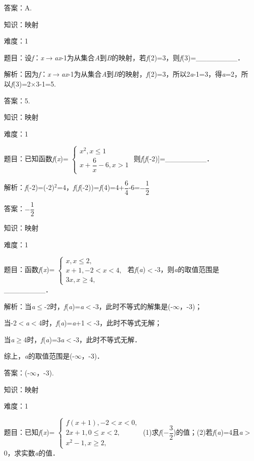 \documentclass{article} %
\begin{document}
答案：A.

知识：映射

难度：1

题目：设\textit{f}：\textit{x}$\mathrm{\to}$\textit{ax}-1为从集合\textit{A}到\textit{B}的映射，若\textit{f}(2)=3，则\textit{f}(3)=\_\_\_\_\_\_\_\_．

解析：因为\textit{f}：\textit{x}$\mathrm{\to}$\textit{ax}-1为从集合\textit{A}到\textit{B}的映射，\textit{f}(2)=3，所以2\textit{a}-1=3，得\textit{a}=2，所以\textit{f}(3)=2$\mathrm{\times}$3-1=5.

答案：5.

知识：映射

难度：1

题目：已知函数\textit{f}(\textit{x})=
$\left\{
\begin{array}{l}
	x^{2},x\le 1\\
	x+\dfrac{6}{x}-6, x> 1
\end{array}
\right.$
则\textit{f}[\textit{f}(-2)]=\_\_\_\_\_\_\_\_．

解析：\textit{f}(-2)=(-2)${}^{2}$=4，\textit{f}(\textit{f}(-2))=\textit{f}(4)=4+$\dfrac{6}{4}$-6=$-\dfrac{1}{2}$

答案：$-\dfrac{1}{2}$

知识：映射

难度：1

题目：函数\textit{f}(\textit{x})=
$\left\{
\begin{array}{l}
	x,x\le 2,\\
	x+1, -2<x<4,\\
	3x, x\ge 4,
\end{array}
\right.$
若\textit{f}(\textit{a})$\mathrm{<}$-3，则\textit{a}的取值范围是\_\_\_\_\_\_\_\_．

解析：当\textit{a}$\mathrm{\le}$-2时，\textit{f}(\textit{a})=\textit{a}$\mathrm{<}$-3，此时不等式的解集是(-$\mathrm{\infty}$，-3)；

当-2$\mathrm{<}$\textit{a}$\mathrm{<}$4时，\textit{f}(\textit{a})=\textit{a}+1$\mathrm{<}$-3，此时不等式无解；

当\textit{a}$\mathrm{\ge}$4时，\textit{f}(\textit{a})=3\textit{a}$\mathrm{<}$-3，此时不等式无解．

综上，\textit{a}的取值范围是(-$\mathrm{\infty}$，-3)．

答案：(-$\mathrm{\infty}$，-3).

知识：映射

难度：1

题目：已知\textit{f}(\textit{x})=
$\left\{
\begin{array}{l}
f(x+1),-2<x< 0,\\
2x+1, 0\le x<2,\\
x^{2}-1, x\ge 2,
\end{array}
\right.$
(1)求\textit{f}($-\dfrac{3}{2}$)的值；(2)若\textit{f}(\textit{a})=4且\textit{a}$\mathrm{>}$0，求实数\textit{a}的值．
\end{document}
